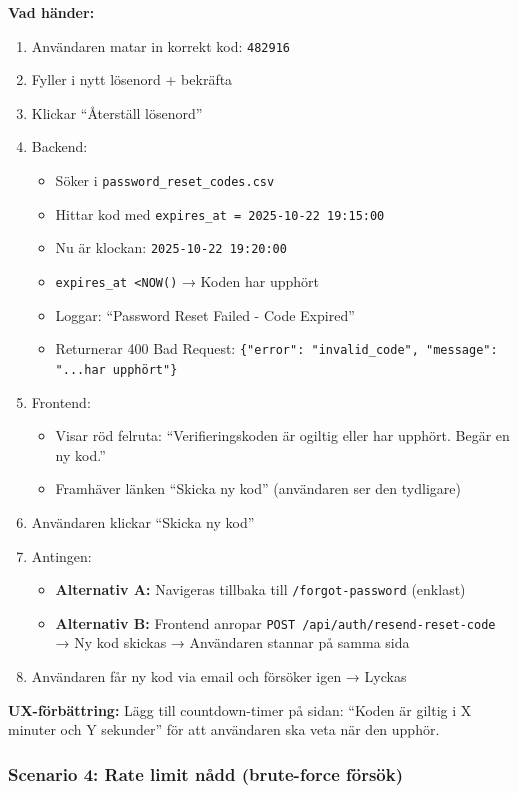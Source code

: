 \documentclass[12pt,a4paper]{article}
\begin{document}
\textbf{Vad händer:}
\begin{enumerate}[noitemsep]
  \item Användaren matar in korrekt kod: \texttt{482916}
  \item Fyller i nytt lösenord + bekräfta
  \item Klickar ``Återställ lösenord''
  \item Backend:
  \begin{itemize}[noitemsep]
    \item Söker i \texttt{password\_reset\_codes.csv}
    \item Hittar kod med \texttt{expires\_at = 2025-10-22 19:15:00}
    \item Nu är klockan: \texttt{2025-10-22 19:20:00}
    \item \texttt{expires\_at \textless NOW()} → Koden har upphört
    \item Loggar: ``Password Reset Failed - Code Expired''
    \item Returnerar 400 Bad Request: \texttt{\{"error": "invalid\_code", "message": "...har upphört"\}}
  \end{itemize}
  \item Frontend:
  \begin{itemize}[noitemsep]
    \item Visar röd felruta: ``Verifieringskoden är ogiltig eller har upphört. Begär en ny kod.''
    \item Framhäver länken ``Skicka ny kod'' (användaren ser den tydligare)
  \end{itemize}
  \item Användaren klickar ``Skicka ny kod''
  \item Antingen:
  \begin{itemize}[noitemsep]
    \item \textbf{Alternativ A:} Navigeras tillbaka till \texttt{/forgot-password} (enklast)
    \item \textbf{Alternativ B:} Frontend anropar \texttt{POST /api/auth/resend-reset-code} → Ny kod skickas → Användaren stannar på samma sida
  \end{itemize}
  \item Användaren får ny kod via email och försöker igen → Lyckas
\end{enumerate}

\textbf{UX-förbättring:} Lägg till countdown-timer på sidan: ``Koden är giltig i X minuter och Y sekunder'' för att användaren ska veta när den upphör.

\subsubsection{Scenario 4: Rate limit nådd (brute-force försök)}
\end{document}
